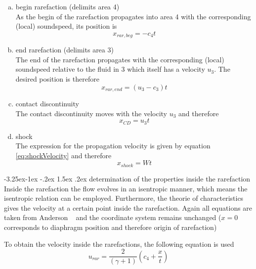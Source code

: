 \documentclass{report}
\makeatletter
\renewcommand\paragraph{\@startsection{paragraph}{4}{\z@}%
  {-3.25ex\@plus -1ex \@minus -.2ex}%
  {1.5ex \@plus .2ex}%
  {\normalfont\normalsize\bfseries}}
\makeatother
\begin{document}
\begin{enumerate} [(a)]

  \item begin rarefaction (delimits area 4) \\
As the begin of the rarefaction propagates into area 4 with the corresponding (local) soundspeed, its position is 
\begin{equation}
 x_{rar,beg}=-c_4 t
\end{equation}

  \item end rarefaction (delimits area 3) \\
The end of the rarefaction propagates with the corresponding (local) soundspeed relative to the fluid in 3 which itself has a velocity $u_3$. The desired position is therefore
\begin{equation}
 x_{rar,end}=(u_3-c_3) t
\end{equation}

  \item contact discontinuity \\
The contact discontinuity moves with the velocity $u_3$ and therefore
\begin{equation}
 x_{CD}=u_3 t
\end{equation}

  \item shock \\
  The expression for the propagation velocity is given by equation \ref{eq:shockVelocity} and therefore
\begin{equation}
 x_{shock}=W t
\end{equation}

\end{enumerate}

\paragraph{determination of the properties inside the rarefaction}
Inside the rarefaction the flow evolves in an isentropic manner, which means the isentropic relation can be employed. Furthermore, the theorie of characteristics gives the velocity at a certain point inside the rarefaction. Again all equations are taken from Anderson ~\cite{Anderson2002} and the coordinate system remains unchanged ($x=0$ corresponds to diaphragm position and therefore origin of rarefaction)

To obtain the velocity inside the rarefactions, the following equation is used
\begin{equation}
 u_{rar}=\frac{2}{(\gamma+1)}(c_4+\frac{x}{t})
\end{equation}
\end{document}
